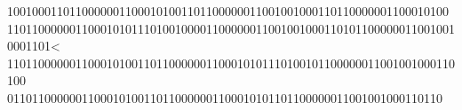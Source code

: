 \documentclass[preview]{standalone}
\begin{document}
\begin{center}
10010001101100000011000101001101100000011001001000110110000001100010100 1101100000011000101011101001000011000000110010010001101011000000110010010001101< 110110000001100010100110110000001100010101110100101100000011001001000110100 0110110000001100010100110110000001100010101101100000011001001000110110
\end{center}
\end{document}
